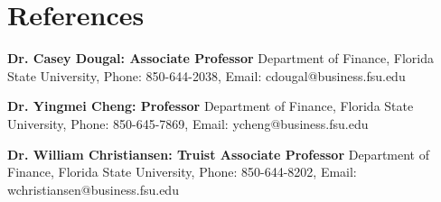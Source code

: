 \documentclass[letterpaper,11pt]{article}
\newcommand{\resumeSubHeadingListStart}{\begin{itemize}[leftmargin=0.15in, label={}]}
\newcommand{\resumeSubHeadingListEnd}{\end{itemize}}
\begin{document}
\section{References}
  \vspace{2pt}
  \resumeSubHeadingListStart
    \small{\item{
        \textbf{Dr. Casey Dougal: Associate Professor}{ Department of Finance, Florida State University, Phone: 850-644-2038, Email: cdougal@business.fsu.edu} \\ \vspace{3pt}

        \textbf{Dr. Yingmei Cheng: Professor}{ Department of Finance, Florida State University, Phone: 850-645-7869, Email:  ycheng@business.fsu.edu} \\ \vspace{3pt}

        \textbf{Dr. William Christiansen: Truist Associate Professor}{ Department of Finance, Florida State University, Phone: 850-644-8202, Email:   wchristiansen@business.fsu.edu} \\ \vspace{3pt}

    }}
  \resumeSubHeadingListEnd
\end{document}
